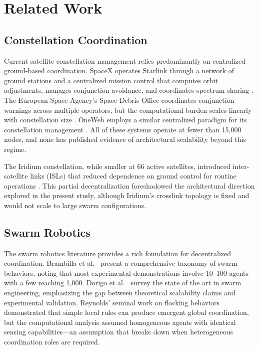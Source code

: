 \documentclass[journal]{IEEEtran}
\begin{document}
\section{Related Work}

\subsection{Constellation Coordination}

Current satellite constellation management relies predominantly on centralized ground-based coordination. SpaceX operates Starlink through a network of ground stations and a centralized mission control that computes orbit adjustments, manages conjunction avoidance, and coordinates spectrum sharing \cite{starlink_ops}. The European Space Agency's Space Debris Office coordinates conjunction warnings across multiple operators, but the computational burden scales linearly with constellation size \cite{esa_conjunction}. OneWeb employs a similar centralized paradigm for its constellation management \cite{oneweb_mgmt}. All of these systems operate at fewer than 15{,}000 nodes, and none has published evidence of architectural scalability beyond this regime.

The Iridium constellation, while smaller at 66 active satellites, introduced inter-satellite links (ISLs) that reduced dependence on ground control for routine operations \cite{iridium_arch}. This partial decentralization foreshadowed the architectural direction explored in the present study, although Iridium's crosslink topology is fixed and would not scale to large swarm configurations.

\subsection{Swarm Robotics}

The swarm robotics literature provides a rich foundation for decentralized coordination. Brambilla et al.~\cite{brambilla_2013} present a comprehensive taxonomy of swarm behaviors, noting that most experimental demonstrations involve 10--100 agents with a few reaching 1{,}000. Dorigo et al.~\cite{dorigo_2021} survey the state of the art in swarm engineering, emphasizing the gap between theoretical scalability claims and experimental validation. Reynolds' seminal work on flocking behaviors \cite{reynolds_1987} demonstrated that simple local rules can produce emergent global coordination, but the computational analysis assumed homogeneous agents with identical sensing capabilities---an assumption that breaks down when heterogeneous coordination roles are required.
\end{document}
